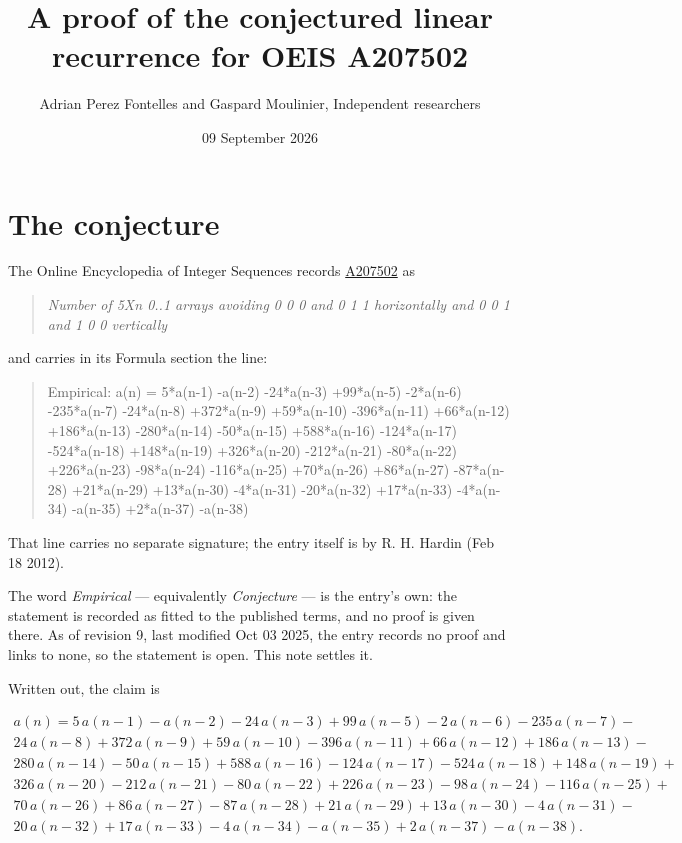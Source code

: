 \documentclass[11pt]{article}
\title{A proof of the conjectured linear recurrence for OEIS A207502}
\author{Adrian Perez Fontelles and Gaspard Moulinier, Independent researchers}
\date{09 September 2026}
\theoremstyle{definition}
\begin{document}
\maketitle
\section{The conjecture}

The Online Encyclopedia of Integer Sequences records \href{https://oeis.org/A207502}{A207502} as

\begin{quote}\itshape Number of 5Xn 0..1 arrays avoiding 0 0 0 and 0 1 1 horizontally and 0 0 1 and 1 0 0 vertically\end{quote}

and carries in its Formula section the line:

\begin{quote}\ttfamily Empirical: a(n) = 5*a(n-1) -a(n-2) -24*a(n-3) +99*a(n-5) -2*a(n-6) -235*a(n-7) -24*a(n-8) +372*a(n-9) +59*a(n-10) -396*a(n-11) +66*a(n-12) +186*a(n-13) -280*a(n-14) -50*a(n-15) +588*a(n-16) -124*a(n-17) -524*a(n-18) +148*a(n-19) +326*a(n-20) -212*a(n-21) -80*a(n-22) +226*a(n-23) -98*a(n-24) -116*a(n-25) +70*a(n-26) +86*a(n-27) -87*a(n-28) +21*a(n-29) +13*a(n-30) -4*a(n-31) -20*a(n-32) +17*a(n-33) -4*a(n-34) -a(n-35) +2*a(n-37) -a(n-38)\end{quote}

That line carries no separate signature; the entry itself is by R. H. Hardin (Feb 18 2012).

The word {\itshape Empirical} --- equivalently {\itshape Conjecture} --- is the entry's own: the statement is recorded as fitted to the published terms, and no proof is given there. As of revision 9, last modified Oct 03 2025, the entry records no proof and links to none, so the statement is open. This note settles it.

Written out, the claim is

\begin{multline*} a(n) = 5\,a(n-1) - a(n-2) - 24\,a(n-3) + 99\,a(n-5) - 2\,a(n-6) - 235\,a(n-7) - \\ 24\,a(n-8) + 372\,a(n-9) + 59\,a(n-10) - 396\,a(n-11) + 66\,a(n-12) + 186\,a(n-13) - \\ 280\,a(n-14) - 50\,a(n-15) + 588\,a(n-16) - 124\,a(n-17) - 524\,a(n-18) + 148\,a(n-19) + \\ 326\,a(n-20) - 212\,a(n-21) - 80\,a(n-22) + 226\,a(n-23) - 98\,a(n-24) - 116\,a(n-25) + \\ 70\,a(n-26) + 86\,a(n-27) - 87\,a(n-28) + 21\,a(n-29) + 13\,a(n-30) - 4\,a(n-31) - \\ 20\,a(n-32) + 17\,a(n-33) - 4\,a(n-34) - a(n-35) + 2\,a(n-37) - a(n-38). \end{multline*}
\end{document}
